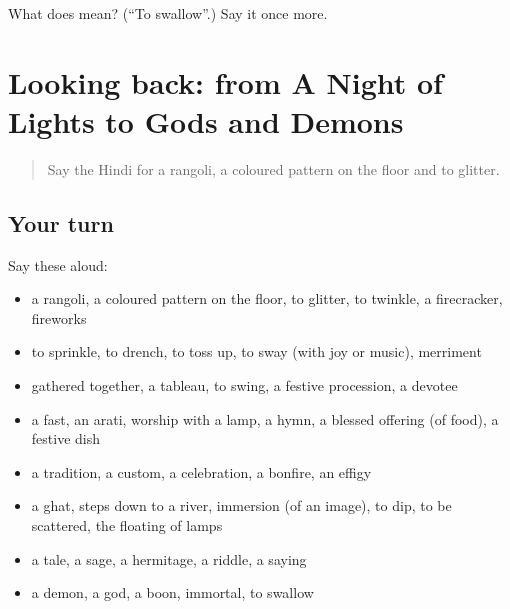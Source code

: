 \begin{tcolorbox}[breakable,colback=teal!4,colframe=teal!35!black,title={Before you move on}]
What does  mean? (\textquotedblleft{}To swallow\textquotedblright{}.) Say it once more.
\end{tcolorbox}
\section[(dialogue)]{Looking back: from A Night of Lights to Gods and Demons}

\label{lesson:HI-R335-review-328-335}



\begin{quote}
Say the Hindi for a rangoli, a coloured pattern on the floor and to glitter.
\end{quote}

\subsection*{Your turn}
Say these aloud:

\begin{itemize}
\raggedright
  \item a rangoli, a coloured pattern on the floor, to glitter, to twinkle, a firecracker, fireworks
  \item to sprinkle, to drench, to toss up, to sway (with joy or music), merriment
  \item gathered together, a tableau, to swing, a festive procession, a devotee
  \item a fast, an arati, worship with a lamp, a hymn, a blessed offering (of food), a festive dish
  \item a tradition, a custom, a celebration, a bonfire, an effigy
  \item a ghat, steps down to a river, immersion (of an image), to dip, to be scattered, the floating of lamps
  \item a tale, a sage, a hermitage, a riddle, a saying
  \item a demon, a god, a boon, immortal, to swallow
\end{itemize}

